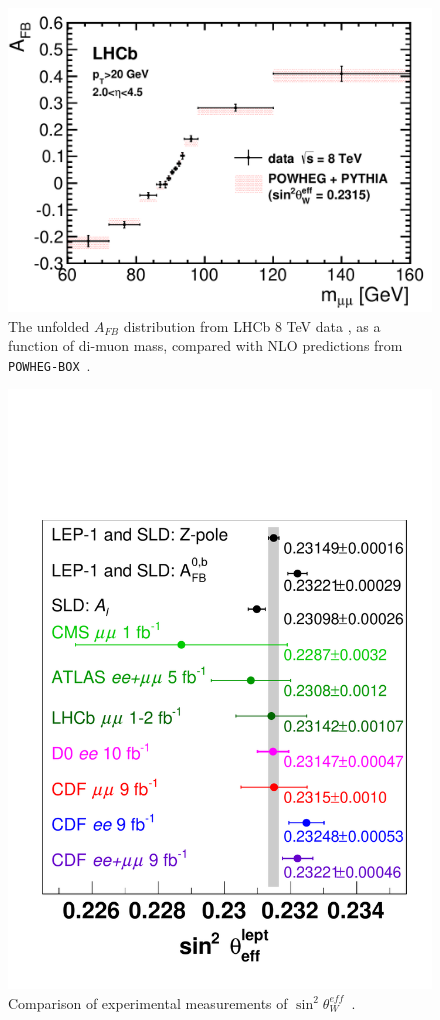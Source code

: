 \begin{figure}[p]
    \centering
    \includegraphics[height=0.3\textheight]{figures/ss-precision-afb-lhcb.pdf}
    \caption{The
unfolded $A_{FB}$ distribution from LHCb 8 TeV data , as a function of di-muon mass, compared with NLO predictions from \texttt{POWHEG-BOX}~\cite{Aaij:2015lka}.
    }
    \label{fig:ss-precision-afb-lhcb}
\end{figure}

\begin{figure}[p]
    \centering
    \includegraphics[height=0.3\textheight]{figures/ss-precision-summary-sin2thetaw.pdf}
    \caption{Comparison of experimental measurements of
$\sin^2\theta^{eff}_{W}$~\cite{Aaltonen:2016nuy}.}
    \label{fig:ss-precision-summary-sin2thetaw}
\end{figure}


